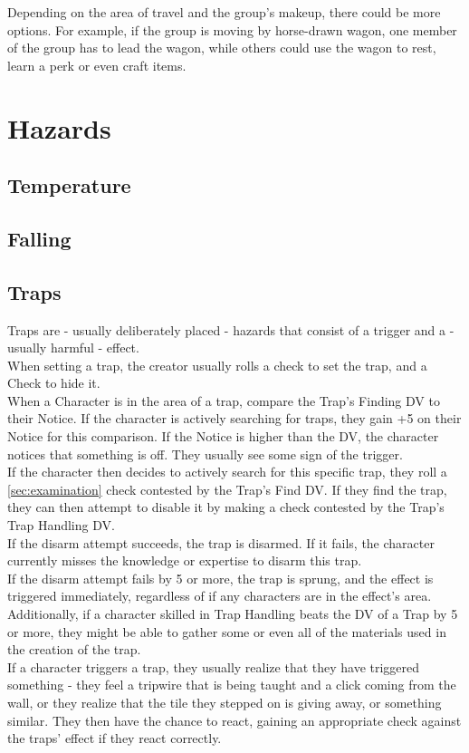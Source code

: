 Depending on the area of travel and the group's makeup, there could be more options. For example, if the group is moving by horse-drawn wagon, one member of the group has to lead the wagon, while others could use the wagon to rest, learn a perk or even craft items.

\section{Hazards}
\subsection{Temperature}
\subsection{Falling}
\subsection{Traps}
Traps are - usually deliberately placed - hazards that consist of a trigger and a - usually harmful - effect.\\
When setting a trap, the creator usually rolls a  check to set the trap, and a  Check to hide it.\\
When a Character is in the area of a trap, compare the Trap's Finding DV to their Notice. If the character is actively searching for traps, they gain +5 on their Notice for this comparison. If the Notice is higher than the DV, the character notices that something is off. They usually see some sign of the trigger.\\
If the character then decides to actively search for this specific trap, they roll a \ref{sec:examination} check contested by the Trap's Find DV. If they find the trap, they can then attempt to disable it by making a  check contested by the Trap's Trap Handling DV.\\
If the disarm attempt succeeds, the trap is disarmed. If it fails, the character currently misses the knowledge or expertise to disarm this trap.\\
If the disarm attempt fails by 5 or more, the trap is sprung, and the effect is triggered immediately, regardless of if any characters are in the effect's area.\\
Additionally, if a character skilled in Trap Handling beats the DV of a Trap by 5 or more, they might be able to gather some or even all of the materials used in the creation of the trap.\\
If a character triggers a trap, they usually realize that they have triggered something - they feel a tripwire that is being taught and a click coming from the wall, or they realize that the tile they stepped on is giving away, or something similar. They then have the chance to react, gaining an appropriate check against the traps' effect if they react correctly.\\
